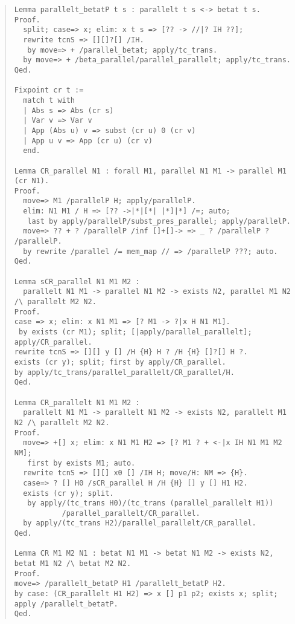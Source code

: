 \documentclass[12pt, titlepage]{ltjsarticle}
\begin{document}
\begin{quote}
\begin{verbatim}
Lemma parallelt_betatP t s : parallelt t s <-> betat t s.
Proof.
  split; case=> x; elim: x t s => [?? -> //|? IH ??];
  rewrite tcnS => [][]?[] /IH.
   by move=> + /parallel_betat; apply/tc_trans.
  by move=> + /beta_parallel/parallel_parallelt; apply/tc_trans.
Qed.

Fixpoint cr t :=
  match t with
  | Abs s => Abs (cr s)
  | Var v => Var v
  | App (Abs u) v => subst (cr u) 0 (cr v)
  | App u v => App (cr u) (cr v)
  end.

Lemma CR_parallel N1 : forall M1, parallel N1 M1 -> parallel M1 (cr N1).
Proof.
  move=> M1 /parallelP H; apply/parallelP.
  elim: N1 M1 / H => [?? ->|*|[*| |*]|*] /=; auto;
   last by apply/parallelP/subst_pres_parallel; apply/parallelP.
  move=> ?? + ? /parallelP /inf []+[]-> => _ ? /parallelP ? /parallelP.
  by rewrite /parallel /= mem_map // => /parallelP ???; auto.
Qed.

Lemma sCR_parallel N1 M1 M2 :
  parallelt N1 M1 -> parallel N1 M2 -> exists N2, parallel M1 N2 /\ parallelt M2 N2.
Proof.
case => x; elim: x N1 M1 => [? M1 -> ?|x H N1 M1].
 by exists (cr M1); split; [|apply/parallel_parallelt]; apply/CR_parallel.
rewrite tcnS => [][] y [] /H {H} H ? /H {H} []?[] H ?.
exists (cr y); split; first by apply/CR_parallel.
by apply/tc_trans/parallel_parallelt/CR_parallel/H.
Qed.

Lemma CR_parallelt N1 M1 M2 :
  parallelt N1 M1 -> parallelt N1 M2 -> exists N2, parallelt M1 N2 /\ parallelt M2 N2.
Proof.
  move=> +[] x; elim: x N1 M1 M2 => [? M1 ? + <-|x IH N1 M1 M2 NM];
   first by exists M1; auto.
  rewrite tcnS => [][] x0 [] /IH H; move/H: NM => {H}.
  case=> ? [] H0 /sCR_parallel H /H {H} [] y [] H1 H2.
  exists (cr y); split.
   by apply/(tc_trans H0)/(tc_trans (parallel_parallelt H1))
           /parallel_parallelt/CR_parallel.
  by apply/(tc_trans H2)/parallel_parallelt/CR_parallel. 
Qed.

Lemma CR M1 M2 N1 : betat N1 M1 -> betat N1 M2 -> exists N2, betat M1 N2 /\ betat M2 N2.
Proof.
move=> /parallelt_betatP H1 /parallelt_betatP H2.
by case: (CR_parallelt H1 H2) => x [] p1 p2; exists x; split; apply /parallelt_betatP.
Qed.
\end{verbatim}
\end{quote}
\end{document}
